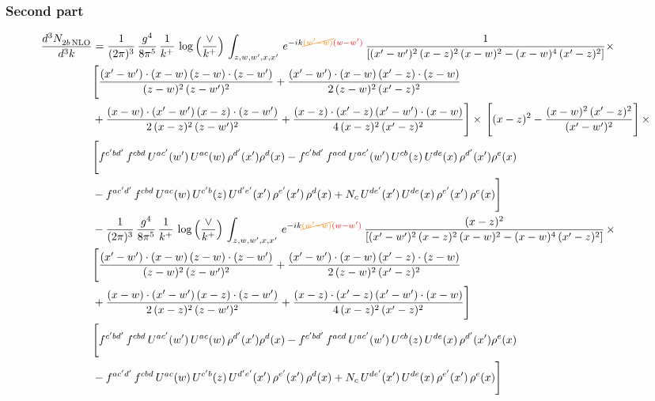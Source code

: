 \documentclass[9pt]{article}
\numberwithin{equation}{section}
\begin{document}
\subsubsection{Second part}
\begin{align}
    \frac{d^{3}N_{2b\,\rm NLO}^{\rm}}{d^{3}k}  & =  \frac{1}{(2\pi)^{3}}\, \frac{g^{4}}{8\pi^{5}}\,\frac{1}{k^{+}}\,\log{\left(\frac{\vee}{k^{+}}\right)}\,\int_{z,w,w^{\prime},x,x'}\, e^{-ik{\color{orange}\cancel{(w^{\prime}-w)}}{\color{red}(w-w^{\prime})}}\, \frac{1}{\left[(x'-w')^{2}\,(x-z)^{2}\,(x-w)^{2} - (x-w)^{4}\, (x'-z)^{2}\right]} \times\notag \\ & \Bigg[\frac{(x'-w')\cdot (x-w)\, (z-w)\cdot (z-w')}{(z-w)^{2}\, (z-w')^{2}}+\frac{(x'-w')\cdot (x-w)\, (x'-z)\cdot (z-w)}{2\, (z-w)^{2}\, (x'-z)^{2}}\notag \\ & +\frac{(x-w)\cdot (x'-w')\, (x-z)\cdot (z-w')}{2\, (x-z)^{2}\, (z-w')^{2}}+\frac{(x-z)\cdot (x'-z)\, (x'-w')\cdot (x-w)}{4\, (x-z)^{2}\, (x'-z)^{2}}\Bigg] \times\,\Bigg[(x-z)^{2} - \frac{(x-w)^{2}\, (x'-z)^{2}}{(x'-w')^{2}}\Bigg]\,\times \notag \\ & \Bigg[f^{c'bd'}\,f^{cbd}\, U^{ac'}(w')\,U^{ac}(w)\,\rho^{d'}(x')\rho^{d}(x)- f^{c'bd'}\,f^{acd}\,U^{ac'}(w')\,U^{cb}(z)\,U^{de}(x)\,\rho^{d'}(x')\rho^{e}(x) \notag \\ & -f^{ac'd'}\,f^{cbd}\,U^{ac}(w)\,U^{c'b}(z)\,U^{d'e'}(x')\,\rho^{e'}(x')\,\rho^{d}(x) +N_{c}\,U^{de'}(x')\,U^{de}(x)\,\rho^{e'}(x')\,\rho^{e}(x)\Bigg] \notag \\
&  - \frac{1}{(2\pi)^{3}}\, \frac{g^{4}}{8\pi^{5}}\,\frac{1}{k^{+}}\,\log{\left(\frac{\vee}{k^{+}}\right)}\,\int_{z,w,w^{\prime},x,x'}\, e^{-ik{\color{orange}\cancel{(w^{\prime}-w)}}{\color{red}(w-w^{\prime})}}\, \frac{(x-z)^{2}}{\left[(x'-w')^{2}\,(x-z)^{2}\,(x-w)^{2} - (x-w)^{4}\, (x'-z)^{2}\right]}\,  \times\notag \\ & \Bigg[\frac{(x'-w')\cdot (x-w)\, (z-w)\cdot (z-w')}{(z-w)^{2}\, (z-w')^{2}}+\frac{(x'-w')\cdot (x-w)\, (x'-z)\cdot (z-w)}{2\, (z-w)^{2}\, (x'-z)^{2}}\notag \\ & +\frac{(x-w)\cdot (x'-w')\, (x-z)\cdot (z-w')}{2\, (x-z)^{2}\, (z-w')^{2}}+\frac{(x-z)\cdot (x'-z)\, (x'-w')\cdot (x-w)}{4\, (x-z)^{2}\, (x'-z)^{2}}\Bigg] \notag \\ & \Bigg[f^{c'bd'}\,f^{cbd}\, U^{ac'}(w')\,U^{ac}(w)\,\rho^{d'}(x')\rho^{d}(x)- f^{c'bd'}\,f^{acd}\,U^{ac'}(w')\,U^{cb}(z)\,U^{de}(x)\,\rho^{d'}(x')\rho^{e}(x) \notag \\ & -f^{ac'd'}\,f^{cbd}\,U^{ac}(w)\,U^{c'b}(z)\,U^{d'e'}(x')\,\rho^{e'}(x')\,\rho^{d}(x) +N_{c}\,U^{de'}(x')\,U^{de}(x)\,\rho^{e'}(x')\,\rho^{e}(x)\Bigg] \notag \\

\end{align}
\end{document}
